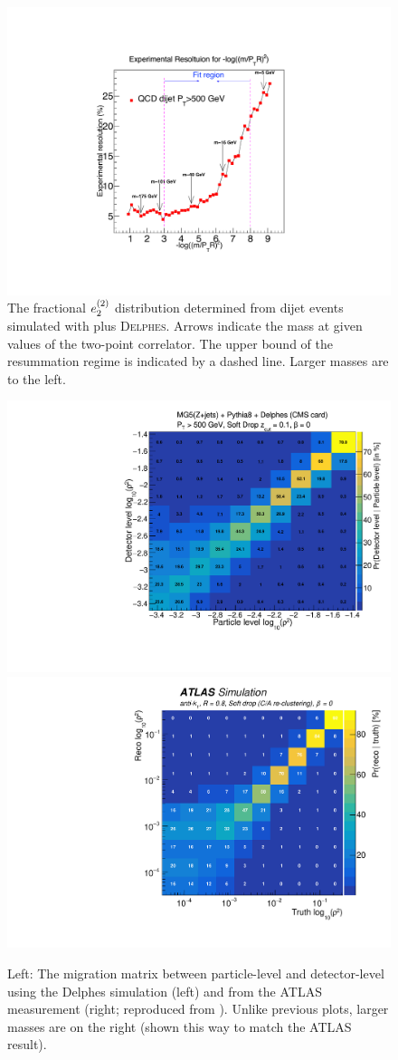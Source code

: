 \begin{figure}[t]
\begin{center}
\includegraphics[width = 0.49\columnwidth]{figures/experimentaldemo/Resolution_plot_logrho_updated2.pdf}
\end{center}
\caption{The fractional $e_{2}^{(2)}$ distribution determined from dijet events simulated with \pythia plus \textsc{Delphes}.  Arrows indicate the mass at given values of the two-point correlator.  The upper bound of the resummation regime is indicated by a dashed line.  Larger masses are to the left.}
\label{fig:resolution}
\end{figure}

\begin{figure}[t]
\begin{center}
\includegraphics[width = 0.49\columnwidth]{figures/experimentaldemo/Rho_2D.pdf}\includegraphics[width = 0.49\columnwidth]{figures/figaux_03a.pdf}
\end{center}
\caption{Left: The migration matrix between particle-level and detector-level using the Delphes simulation (left) and from the ATLAS measurement (right; reproduced from ).  Unlike previous plots, larger masses are on the right (shown this way to match the ATLAS result). }
\label{fig:expres}
\end{figure}

